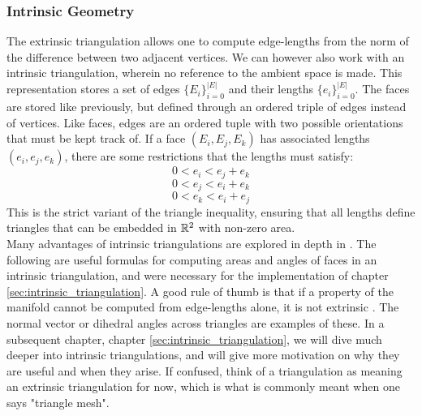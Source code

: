 \subsubsection*{Intrinsic Geometry}
The extrinsic triangulation allows one to compute edge-lengths from the norm of the difference between two adjacent vertices. We can however also work with an intrinsic triangulation, wherein no reference to the ambient space is made. This representation stores a set of edges $\{E_i\}_{i=0}^{|E|}$ and their lengths $\{e_i\}_{i=0}^{|E|}$. The faces are stored like previously, but defined through an ordered triple of edges instead of vertices. Like faces, edges are an ordered tuple with two possible orientations that must be kept track of. If a face $(E_i, E_j, E_k)$ has associated lengths $(e_i, e_j, e_k)$, there are some restrictions that the lengths must satisfy: 
$$0 < e_i < e_j + e_k$$
$$0 < e_j < e_i + e_k$$
$$0 < e_k < e_i + e_j$$
This is the strict variant of the triangle inequality, ensuring that all lengths define triangles that can be embedded in $\mathbb{R}^2$ with non-zero area.
\\
Many advantages of intrinsic triangulations are explored in depth in \cite{sharp2021intrinsic}. The following are useful formulas for computing areas and angles of faces in an intrinsic triangulation, and were necessary for the implementation of chapter \ref{sec:intrinsic_triangulation}.
A good rule of thumb is that if a property of the manifold cannot be computed from edge-lengths alone, it is not extrinsic \cite{sharp2021intrinsic}. The normal vector or dihedral angles across triangles are examples of these.
In a subsequent chapter, chapter \ref{sec:intrinsic_triangulation}, we will dive much deeper into intrinsic triangulations, and will give more motivation on why they are useful and when they arise. If confused, think of a triangulation as meaning an extrinsic triangulation for now, which is what is commonly meant when one says "triangle mesh".
